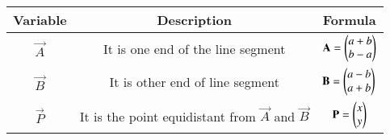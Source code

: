\begin{center}
    \begin{tabular}{|c|c|c|} 
        \hline
            \textbf{Variable} & \textbf{Description} & \textbf{Formula} \\ 
        \hline
            $\vec{A}$   & It is one end of the line segment & $\mathbf{A} = \begin{pmatrix}a+b\\b-a\end{pmatrix}$ \\ 
        \hline
            $\vec{B}$   & It is other end of line segment &  $\mathbf{B} = \begin{pmatrix}a-b\\a+b\end{pmatrix}$\\ 
        \hline
            $\vec{P}$   & It is the point equidistant from $\vec{A}$ and $\vec{B}$ & $\mathbf{P}  = \begin{pmatrix}x\\y\end{pmatrix}$\\ 
        \hline
    \end{tabular}
\end{center}